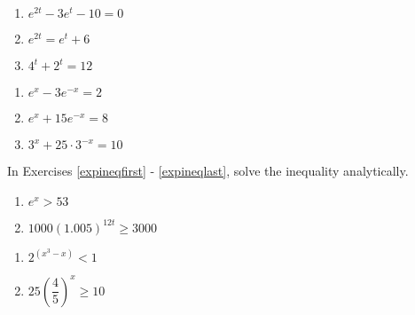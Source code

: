 \documentclass{ximera}
\begin{document}
\begin{multicols}{3}
\begin{enumerate}
\setcounter{enumi}{\value{HW}}

\item $e^{2t} - 3e^{t}-10=0$ %
\item $e^{2t} = e^{t}+6$ %
\item $4^{t} + 2^{t} = 12$ %


\setcounter{HW}{\value{enumi}}
\end{enumerate}
\end{multicols}

\begin{multicols}{3}
\begin{enumerate}
\setcounter{enumi}{\value{HW}}

\item $e^{x}-3e^{-x}=2$ %
\item $e^{x}+15e^{-x}=8$ %
\item $3^{x}+25\cdot3^{-x}=10$ %
\label{expeqnlast} 

\setcounter{HW}{\value{enumi}}
\end{enumerate}
\end{multicols}

In Exercises \ref{expineqfirst} - \ref{expineqlast}, solve the inequality analytically.

\begin{multicols}{2} 
\begin{enumerate}
\setcounter{enumi}{\value{HW}}

\item $e^{x} > 53$ \label{expineqfirst} 
\item $1000\left(1.005\right)^{12t} \geq 3000$ 

\setcounter{HW}{\value{enumi}}
\end{enumerate}
\end{multicols}

\begin{multicols}{2} 
\begin{enumerate}
\setcounter{enumi}{\value{HW}}

\item $2^{(x^{3} - x)} < 1$
\item $25\left(\dfrac{4}{5}\right)^{x} \geq 10$

\setcounter{HW}{\value{enumi}}
\end{enumerate}
\end{multicols}
\end{document}
